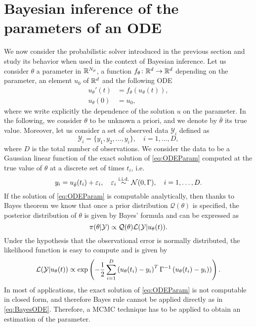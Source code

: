 \section{Bayesian inference of the parameters of an ODE}\label{sec:THREE}

We now consider the probabilistic solver introduced in the previous section and study its behavior when used in the context of Bayesian inference. Let us consider $\theta$ a parameter in $\mathbb{R}^{N_p}$, a function $f_\theta\colon \mathbb{R}^d \to \mathbb{R}^d$ depending on the parameter, an element $u_0$ of $\mathbb{R}^d$ and the following ODE 
\begin{equation}\label{eq:ODEParam}
\begin{aligned}
	u_\theta' (t) &= f_\theta(u_\theta(t)),\\
			 u_\theta(0) &= u_0,
\end{aligned}
\end{equation}
where we write explicitly the dependence of the solution $u$ on the parameter. In the following, we consider $\theta$ to be unknown a priori, and we denote by $\bar \theta$ its true value. Moreover, let us consider a set of observed data $\mathcal{Y}_i$ defined as
\begin{equation}
	\mathcal{Y}_i = \{y_1, y_2, \ldots, y_i\}, \quad i = 1, \ldots, D,
\end{equation} 
where $D$ is the total number of observations. We consider the data to be a Gaussian linear function of the exact solution of \eqref{eq:ODEParam} computed at the true value of $\theta$ at a discrete set of times $t_i$, i.e.
\begin{equation}
	y_i = u_{\bar\theta}(t_i) + \varepsilon_i, \quad \varepsilon_i \stackrel{\text{i.i.d.}}{\sim} \mathcal{N}(0, \Gamma), \quad i = 1, \ldots, D.
\end{equation} 
If the solution of \eqref{eq:ODEParam} is computable analytically, then thanks to Bayes theorem we know that once a prior distribution $\mathcal{Q}(\theta)$ is specified, the posterior distribution of $\theta$ is given by Bayes' formula and can be expressed as
\begin{equation}\label{eq:BayesODE}
	\pi(\theta|\mathcal Y) \propto \mathcal{Q}(\theta) \mathcal{L}(\mathcal Y|u_\theta(t)).
\end{equation}
 Under the hypothesis that the observational error is normally distributed, the likelihood function is easy to compute and is given by
 \begin{equation}\label{eq:likelihood}
	 \mathcal{L}(\mathcal Y|u_\theta(t)) \propto \exp\left(-\frac{1}{2}\sum_{i=1}^{D}\left(u_\theta(t_i) - y_i\right)^T \Gamma^{-1} \left(u_\theta(t_i) - y_i) \right)\right).
 \end{equation}
 In most of applications, the exact solution of \eqref{eq:ODEParam} is not computable in closed form, and therefore Bayes rule cannot be applied directly as in \eqref{eq:BayesODE}. Therefore, a MCMC technique has to be applied to obtain an estimation of the parameter.
 





